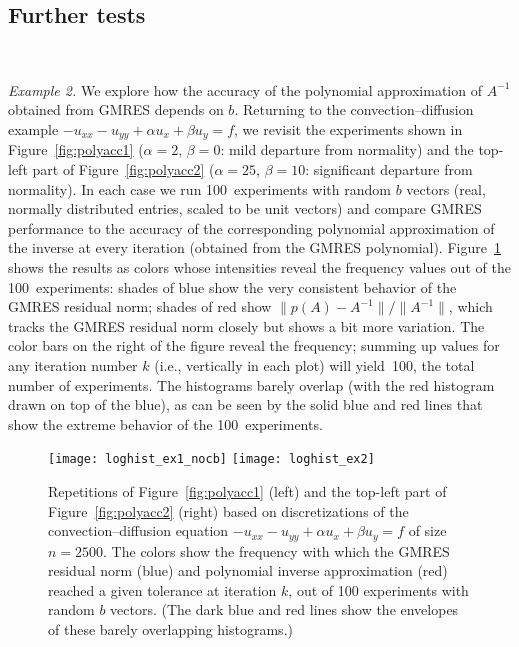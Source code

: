 \documentclass{siamart}
\begin{document}
\subsection{Further tests}

\

{\it Example 2.} 
We explore how the accuracy of the polynomial approximation of $A^{-1}$ obtained from GMRES depends on $b$.
Returning to the convection--diffusion example $- u_{xx} - u_{yy} + \alpha u_{x} + \beta u_y = f $,   we revisit the experiments shown in Figure~\ref{fig:polyacc1}
($\alpha=2$, $\beta=0$: mild departure from normality) and the top-left part of Figure~\ref{fig:polyacc2} ($\alpha=25$, $\beta=10$: significant departure from normality).  
In each case we run 100~experiments with random $b$ vectors (real, normally distributed entries, scaled to be unit vectors) and compare GMRES performance to the accuracy of the corresponding polynomial approximation of the inverse at every iteration (obtained from the GMRES polynomial).  Figure~\ref{fig:loghist} shows the results as colors whose intensities reveal the frequency values out of the 100~experiments: shades of blue show the very consistent behavior of the GMRES residual norm; shades of red show $\|p(A)-A^{-1}\|/\|A^{-1}\|$, which tracks the GMRES residual norm closely but shows a bit more variation.  The color bars on the right of the figure reveal the frequency; summing up values for any iteration number $k$ (i.e., vertically in each plot) will yield~100, the total number of experiments.  The histograms barely overlap (with the red histogram drawn on top of the blue), as can be seen by the solid blue and red lines that show the extreme behavior of the 100~experiments.

\begin{figure}
\begin{center}
   \texttt{[image: loghist\_ex1\_nocb]}\quad
   \texttt{[image: loghist\_ex2]}
\end{center}

\vspace*{-5pt}
\caption{Repetitions of Figure~\ref{fig:polyacc1} (left) and the top-left part of Figure~\ref{fig:polyacc2} (right) based on discretizations of the convection--diffusion equation $- u_{xx} - u_{yy} + \alpha u_{x} + \beta u_y = f $ of size $n=2500$.  The colors show the frequency with which the GMRES residual norm (blue) and polynomial inverse approximation (red) reached a given tolerance at iteration $k$, out of 100 experiments with random $b$ vectors.  (The dark blue and red lines show the envelopes of these barely overlapping histograms.)}
\label{fig:loghist}
\end{figure}
\end{document}
